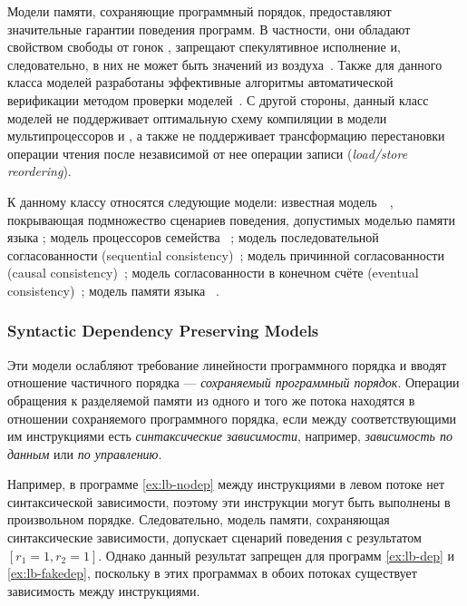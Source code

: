 Модели памяти, сохраняющие программный порядок, 
предоставляют значительные  гарантии  поведения программ. 
В частности, они обладают свойством свободы от гонок \DRF, 
запрещают спекулятивное исполнение и, следовательно, 
в них не может быть значений из воздуха~\cite{Lahav-al:PLDI17}. 
Также для данного класса моделей разработаны эффективные 
алгоритмы автоматической верификации 
методом проверки моделей~\cite{Kokologiannakis-al:POPL2017, Kokologiannakis:PLDI2019}.
С другой стороны, данный класс моделей не поддерживает
оптимальную схему компиляции в модели мультипроцессоров
\ARM и \POWER, а также не поддерживает трансформацию 
перестановки операции чтения после независимой
от нее операции записи (\emph{load/store reordering}). 

К данному классу относятся 
 следующие модели: известная  модель~\RCMM~\cite{Lahav-al:PLDI17}, 
покрывающая подмножество сценариев поведения, допустимых моделью памяти языка \CLANG;
 модель \TSO процессоров семейства \Intel~\cite{Sewell-al:CACM10}; 
модель последовательной согласованности (sequential consistency)~\cite{Lamport:TC79}; модель
причинной согласованности (causal consistency)~\autocite{Lahav-Boker:PLDI2020}; 
модель  согласованности в конечном счёте (eventual consistency)~\cite{Jagadeesan-al:ESOP2018};
 модель памяти языка \OCaml~\cite{Dolan-al:PLDI18}.

\subsubsection*{Syntactic Dependency Preserving Models}

Эти модели ослабляют требование линейности программного порядка 
и вводят отношение частичного порядка --- \emph{сохраняемый программный порядок}. 
Операции обращения к разделяемой памяти из одного и того же потока
находятся в отношении сохраняемого программного порядка, 
если между соответствующими им инструкциями есть 
\emph{синтаксические зависимости}, например, 
\emph{зависимость по данным} или \emph{по управлению}. 

Например, в программе \ref{ex:lb-nodep} между инструкциями в 
левом потоке нет синтаксической зависимости, 
поэтому эти инструкции могут быть выполнены в произвольном порядке. 
Следовательно, модель памяти, сохраняющая синтаксические зависимости, 
допускает сценарий поведения с результатом ${[r_1=1,r_2=1]}$. 
Однако данный результат запрещен для программ 
\ref{ex:lb-dep} и \ref{ex:lb-fakedep}, 
поскольку в этих программах в обоих потоках существует зависимость 
между инструкциями. 

